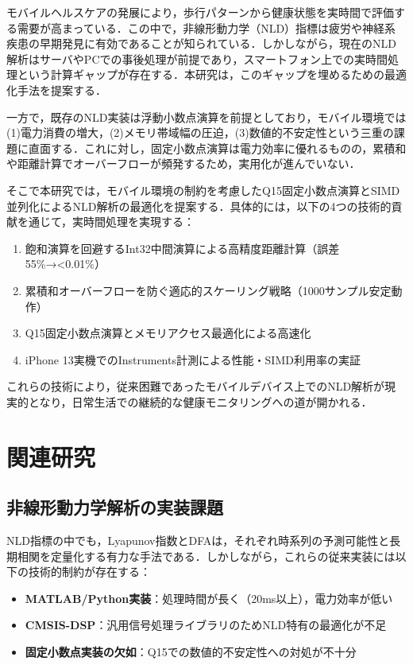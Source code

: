 \documentclass[paper]{ieice}
\begin{document}
モバイルヘルスケアの発展により，歩行パターンから健康状態を実時間で評価する需要が高まっている．この中で，非線形動力学（NLD）指標は疲労や神経系疾患の早期発見に有効であることが知られている\cite{hausdorff2009}\cite{peng1995}．しかしながら，現在のNLD解析はサーバやPCでの事後処理が前提であり，スマートフォン上での実時間処理という計算ギャップが存在する．本研究は，このギャップを埋めるための最適化手法を提案する．

一方で，既存のNLD実装は浮動小数点演算を前提としており，モバイル環境では(1)電力消費の増大，(2)メモリ帯域幅の圧迫，(3)数値的不安定性という三重の課題に直面する．これに対し，固定小数点演算は電力効率に優れるものの，累積和や距離計算でオーバーフローが頻発するため，実用化が進んでいない．

そこで本研究では，モバイル環境の制約を考慮したQ15固定小数点演算とSIMD並列化によるNLD解析の最適化を提案する．具体的には，以下の4つの技術的貢献を通じて，実時間処理を実現する：

\begin{enumerate}
\item 飽和演算を回避するInt32中間演算による高精度距離計算（誤差55\%→<0.01\%）
\item 累積和オーバーフローを防ぐ適応的スケーリング戦略（1000サンプル安定動作）
\item Q15固定小数点演算とメモリアクセス最適化による高速化
\item iPhone 13実機でのInstruments計測による性能・SIMD利用率の実証
\end{enumerate}

これらの技術により，従来困難であったモバイルデバイス上でのNLD解析が現実的となり，日常生活での継続的な健康モニタリングへの道が開かれる．

\section{関連研究}

\subsection{非線形動力学解析の実装課題}

NLD指標の中でも，Lyapunov指数\cite{rosenstein1993}とDFA\cite{peng1994}は，それぞれ時系列の予測可能性と長期相関を定量化する有力な手法である．しかしながら，これらの従来実装には以下の技術的制約が存在する：

\begin{itemize}
\item \textbf{MATLAB/Python実装}：処理時間が長く（20ms以上），電力効率が低い
\item \textbf{CMSIS-DSP}\cite{arm2020}：汎用信号処理ライブラリのためNLD特有の最適化が不足
\item \textbf{固定小数点実装の欠如}：Q15での数値的不安定性への対処が不十分
\end{itemize}
\end{document}
